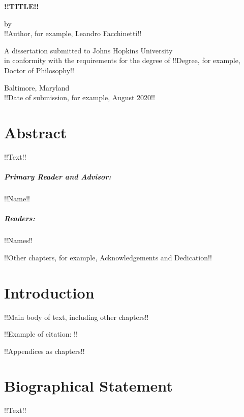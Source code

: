 \documentclass[12pt, oneside]{book}
\begin{document}
\frontmatter

\begin{center}
\begin{singlespace}
\vspace*{0.5in}

\textbf{\uppercase{!!Title!!}}

\vspace*{1in}

by\\!!Author, for example, Leandro Facchinetti!!

\vspace*{1.5in}

A dissertation submitted to Johns Hopkins University\\in conformity with the requirements for the degree of !!Degree, for example, Doctor of Philosophy!!

\vspace*{0.5in}

Baltimore, Maryland\\!!Date of submission, for example, August 2020!!
\end{singlespace}
\end{center}

\thispagestyle{empty}
\clearpage

\chapter{Abstract}

!!Text!!

\paragraph{Primary Reader and Advisor:}

!!Name!!

\paragraph{Readers:}

!!Names!!

!!Other chapters, for example, Acknowledgements and Dedication!!

\tableofcontents
\listoftables
\listoffigures

\mainmatter

\chapter{Introduction}

!!Main body of text, including other chapters!!

!!Example of citation: \cite{template}!!

\appendix

!!Appendices as chapters!!

\backmatter




\chapter{Biographical Statement}

!!Text!!
\end{document}
